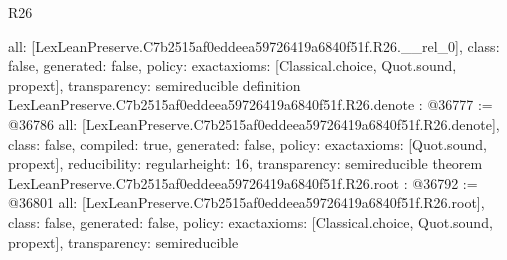 \begin{lexlean}{R26}
\begin{coremodule}
{  all: [LexLeanPreserve.C7b2515af0eddeea59726419a6840f51f.R26.__rel_0],
  class: false,
  generated: false,
  policy: exact{axioms: [Classical.choice, Quot.sound, propext]},
  transparency: semireducible
}
definition LexLeanPreserve.C7b2515af0eddeea59726419a6840f51f.R26.denote : @36777 := @36786 {
  all: [LexLeanPreserve.C7b2515af0eddeea59726419a6840f51f.R26.denote],
  class: false,
  compiled: true,
  generated: false,
  policy: exact{axioms: [Quot.sound, propext]},
  reducibility: regular{height: 16},
  transparency: semireducible
}
theorem LexLeanPreserve.C7b2515af0eddeea59726419a6840f51f.R26.root : @36792 := @36801 {
  all: [LexLeanPreserve.C7b2515af0eddeea59726419a6840f51f.R26.root],
  class: false,
  generated: false,
  policy: exact{axioms: [Classical.choice, Quot.sound, propext]},
  transparency: semireducible
}


\end{coremodule}
\end{lexlean}
